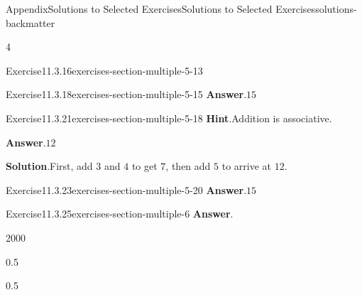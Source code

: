 \documentclass[twoside,10pt,]{article}
\newcommand{\blocktitlefont}{\relax}
\newcommand{\tabularfont}{\relax}
\numberwithin{equation}{section}
\newcommand{\hrulemedium}{\noalign{\hrule height 0.07em}}
\begin{document}
\begin{solutions-section}{Appendix}{Solutions to Selected Exercises}{}{Solutions to Selected Exercises}{}{}{solutions-backmatter}
\begin{exercisegroupcol}{4}
\begin{divisionsolutionegcol}{Exercise}{11.3.16}{}{exercises-section-multiple-5-13}
\end{divisionsolutionegcol}%
\begin{divisionsolutionegcol}{Exercise}{11.3.18}{}{exercises-section-multiple-5-15}%
\noindent\textbf{\blocktitlefont Answer}.\hypertarget{exercises-section-multiple-5-15-2-back}{}\quad{}\(15\)%
\end{divisionsolutionegcol}%
\begin{divisionsolutionegcol}{Exercise}{11.3.21}{}{exercises-section-multiple-5-18}%
\noindent\textbf{\blocktitlefont Hint}.\hypertarget{exercises-section-multiple-5-18-2-back}{}\quad{}Addition is associative.%
\par\smallskip%
\noindent\textbf{\blocktitlefont Answer}.\hypertarget{exercises-section-multiple-5-18-3-back}{}\quad{}\(12\)%
\par\smallskip%
\noindent\textbf{\blocktitlefont Solution}.\hypertarget{exercises-section-multiple-5-18-4-back}{}\quad{}First, add \(3\) and \(4\) to get \(7\), then add \(5\) to arrive at \(12\).%
\end{divisionsolutionegcol}%
\begin{divisionsolutionegcol}{Exercise}{11.3.23}{}{exercises-section-multiple-5-20}%
\noindent\textbf{\blocktitlefont Answer}.\hypertarget{exercises-section-multiple-5-20-2-back}{}\quad{}\(15\)%
\end{divisionsolutionegcol}%
\end{exercisegroupcol}
\par\medskip\noindent
\begin{divisionsolution}{Exercise}{11.3.25}{}{exercises-section-multiple-6}%
\noindent\textbf{\blocktitlefont Answer}.\hypertarget{exercises-section-multiple-6-2-back}{}\quad{}\begin{sidebyside}{2}{0}{0}{0}%
\begin{sbspanel}{0.5}%
\noindent\resizebox{\ifdim\width > \linewidth\linewidth\else\width\fi}{!}{%
{\centering%
{\tabularfont%
\begin{tabular}{cc}
{\bfseries{}\(x\)}&{\bfseries{}\(f(x)\)}\tabularnewline\hrulemedium
\(0\)&\(0\)\tabularnewline[0pt]
\(1\)&\(1\)\tabularnewline[0pt]
\(2\)&\(4\)\tabularnewline[0pt]
\(3\)&\(9\)
\end{tabular}
}%
\par}
}%
\end{sbspanel}%
\begin{sbspanel}{0.5}%
\noindent{}
\end{sbspanel}
\end{sidebyside}
\end{divisionsolution}
\end{solutions-section}
\end{document}
